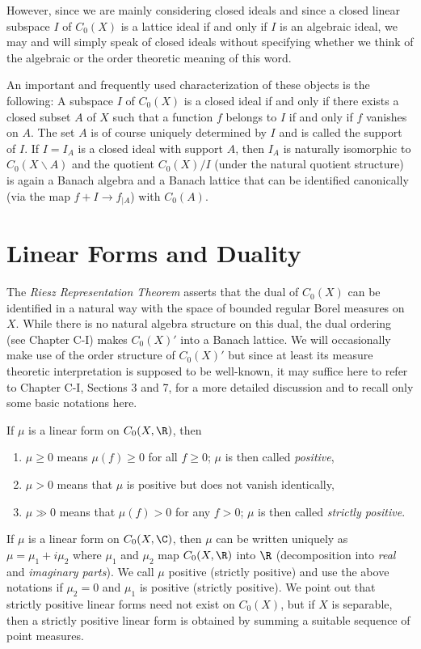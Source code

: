 However, since we are mainly considering closed ideals and since a closed linear subspace $I$ of $C_{0}(X)$ is a lattice ideal if and only if $I$ is an algebraic ideal, we may and will simply speak of closed ideals without specifying whether we think of the algebraic or the order theoretic meaning of this word.

An important and frequently used characterization of these objects is the following: A subspace $I$ of $C_{0}(X)$ is a closed ideal if and only if there exists a closed subset $A$ of $X$ such that a function $f$ belongs to $I$ if and only if $f$ vanishes on $A$.
The set $A$ is of course uniquely determined by $I$ and is called the support of $I$.
If $I = I_{A}$ is a closed ideal with support $A$, then $I_{A}$ is naturally isomorphic to $C_{0}(X\backslash A)$ and the quotient $C_{0}(X)/I$ (under the natural quotient structure) is again a Banach algebra and a Banach lattice that can be identified canonically (via the map $f + I \to f_{|A}$) with $C_{0}(A)$.
\section{Linear Forms and Duality}\label{sec:b1-2}
The \emph{Riesz Representation Theorem} asserts that the dual of $C_{0}(X)$ can be identified in a natural way with the space of bounded regular Borel measures on $X$.
While there is no natural algebra structure on this dual, the dual ordering (see Chapter C-I) makes $C_{0}(X)'$ into a Banach lattice.
We will occasionally make use of the order structure of $C_{0}(X)'$ but since at least its measure theoretic interpretation is supposed to be well-known, it may suffice here to refer to Chapter C-I, Sections 3 and 7, for a more detailed discussion and to recall only some basic notations here.

\noindent If $\mu$ is a linear form on $C_{0}(X,\R)$, then
\begin{enumerate}[label=]

\item
$\mu \geq 0$ means  $ \mu(f) \geq 0 $ for all $ f \geq 0 $;  $ \mu $ is then called \emph{positive},

\item
$ \mu > 0 $ means that $ \mu $ is positive but does not vanish identically,

\item
$ \mu \gg 0 $ means that $ \mu(f) > 0 $ for any $ f > 0 $;  $ \mu $ is then called \emph{strictly positive}.

\end{enumerate}
If $\mu$ is a linear form on $C_{0}(X,\C)$, then $\mu$ can be written uniquely as $\mu = \mu_{1} + i\mu_{2}$ where $\mu_{1}$ and $\mu_{2}$ map $C_{0}(X,\R)$ into $\R$ (decomposition into \emph{real} and \emph{imaginary parts}).
We call $\mu$ positive (strictly positive) and use the above notations if $\mu_{2} = 0$ and $\mu_{1}$ is positive (strictly positive).
We point out that strictly positive linear forms need not exist on $C_{0}(X)$, but if $X$ is separable, then a strictly positive linear form is obtained by summing a suitable sequence of point measures.

